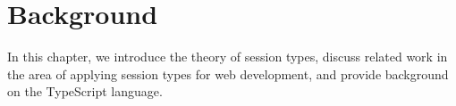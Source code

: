 \chapter{Background}
\label{chap:background}

In this chapter,
we introduce the theory
of session types,
discuss related work
in the area of applying
session types for web development,
and provide background on the TypeScript language.

%






%

%
